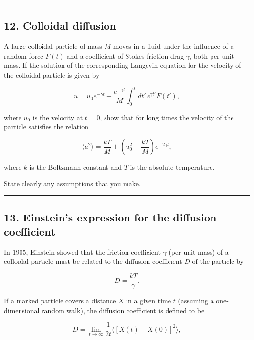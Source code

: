 \documentclass[
  letterpaper,
  DIV=11,
  numbers=noendperiod]{scrreprt}
\begin{document}
\begin{center}\rule{0.5\linewidth}{0.5pt}\end{center}

\subsection*{12. Colloidal diffusion}\label{colloidal-diffusion}

A large colloidal particle of mass \(M\) moves in a fluid under the
influence of a random force \(F(t)\) and a coefficient of Stokes
friction drag \(\gamma\), both per unit mass. If the solution of the
corresponding Langevin equation for the velocity of the colloidal
particle is given by

\[
u = u_0 e^{-\gamma t} + \frac{e^{-\gamma t}}{M} \int_0^t dt' \, e^{\gamma t'} F(t'),
\]

where \(u_0\) is the velocity at \(t = 0\), show that for long times the
velocity of the particle satisfies the relation

\[
\langle u^2 \rangle = \frac{kT}{M} + \left( u_0^2 - \frac{kT}{M} \right) e^{-2\gamma t},
\]

where \(k\) is the Boltzmann constant and \(T\) is the absolute
temperature.

State clearly any assumptions that you make.

\begin{center}\rule{0.5\linewidth}{0.5pt}\end{center}

\subsection*{13. Einstein's expression for the diffusion
coefficient}\label{einsteins-expression-for-the-diffusion-coefficient}

In 1905, Einstein showed that the friction coefficient \(\gamma\) (per
unit mass) of a colloidal particle must be related to the diffusion
coefficient \(D\) of the particle by

\[
D = \frac{kT}{\gamma}.
\]

If a marked particle covers a distance \(X\) in a given time \(t\)
(assuming a one-dimensional random walk), the diffusion coefficient is
defined to be

\[
D = \lim_{t \to \infty} \frac{1}{2t} \langle [X(t) - X(0)]^2 \rangle,
\]
\end{document}

